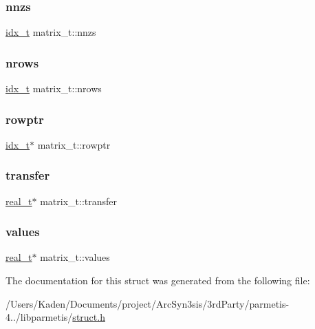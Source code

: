 \mbox{\label{a00754_afd8bba971cd6b6099b02bc3bf5947dd3}} 
\subsubsection{\texorpdfstring{nnzs}{nnzs}}
{\footnotesize\ttfamily \hyperlink{a00876_aaa5262be3e700770163401acb0150f52}{idx\+\_\+t} matrix\+\_\+t\+::nnzs}

\mbox{\label{a00754_ac20aa30eed145aeee3a266fbea756769}} 
\subsubsection{\texorpdfstring{nrows}{nrows}}
{\footnotesize\ttfamily \hyperlink{a00876_aaa5262be3e700770163401acb0150f52}{idx\+\_\+t} matrix\+\_\+t\+::nrows}

\mbox{\label{a00754_a824811193a913c152603e16be365dcca}} 
\subsubsection{\texorpdfstring{rowptr}{rowptr}}
{\footnotesize\ttfamily \hyperlink{a00876_aaa5262be3e700770163401acb0150f52}{idx\+\_\+t}$\ast$ matrix\+\_\+t\+::rowptr}

\mbox{\label{a00754_ae7a45331b8f617a43a9f244561b22191}} 
\subsubsection{\texorpdfstring{transfer}{transfer}}
{\footnotesize\ttfamily \hyperlink{a00876_a1924a4f6907cc3833213aba1f07fcbe9}{real\+\_\+t}$\ast$ matrix\+\_\+t\+::transfer}

\mbox{\label{a00754_a9a918d16aa3d96259a8ff5491870685b}} 
\subsubsection{\texorpdfstring{values}{values}}
{\footnotesize\ttfamily \hyperlink{a00876_a1924a4f6907cc3833213aba1f07fcbe9}{real\+\_\+t}$\ast$ matrix\+\_\+t\+::values}



The documentation for this struct was generated from the following file\+:\begin{DoxyCompactItemize}
\item 
/\+Users/\+Kaden/\+Documents/project/\+Arc\+Syn3sis/3rd\+Party/parmetis-\/4../libparmetis/\hyperlink{a00978}{struct.\+h}\end{DoxyCompactItemize}

